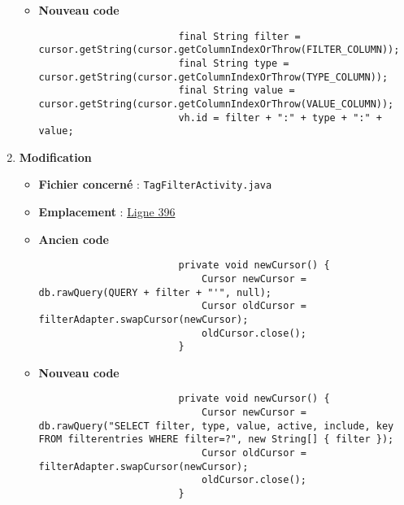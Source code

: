 \begin{enumerate}
\begin{itemize}
              \item \textbf{Nouveau code}
                    \begin{verbatim}
                        final String filter = cursor.getString(cursor.getColumnIndexOrThrow(FILTER_COLUMN));
                        final String type = cursor.getString(cursor.getColumnIndexOrThrow(TYPE_COLUMN));
                        final String value = cursor.getString(cursor.getColumnIndexOrThrow(VALUE_COLUMN));
                        vh.id = filter + ":" + type + ":" + value;
                    \end{verbatim}
          \end{itemize}
    \item \textbf{Modification}
          \begin{itemize}
              \item \textbf{Fichier concerné} : \texttt{TagFilterActivity.java}
              \item \textbf{Emplacement} :
                    \href{https://github.com/MarcusWolschon/osmeditor4android/blob/dcabe8084aa15f5551a37c990516bf73398af1bf/src/main/java/de/blau/android/filter/TagFilterActivity.java#L396}{Ligne 396}
              \item \textbf{Ancien code}
                    \begin{verbatim}
                        private void newCursor() {
                            Cursor newCursor = db.rawQuery(QUERY + filter + "'", null);
                            Cursor oldCursor = filterAdapter.swapCursor(newCursor);
                            oldCursor.close();
                        }
                    \end{verbatim}
              \item \textbf{Nouveau code}
                    \begin{verbatim}
                        private void newCursor() {
                            Cursor newCursor = db.rawQuery("SELECT filter, type, value, active, include, key FROM filterentries WHERE filter=?", new String[] { filter });
                            Cursor oldCursor = filterAdapter.swapCursor(newCursor);
                            oldCursor.close();
                        }
                    \end{verbatim}
          \end{itemize}
\end{enumerate}